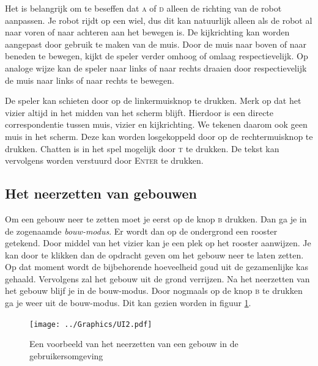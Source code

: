     Het is belangrijk om te beseffen dat \textsc{a} of \textsc{d} alleen de richting van de robot aanpassen. Je robot rijdt op een wiel, dus dit kan natuurlijk alleen als de robot al naar voren of naar achteren aan het bewegen is. De kijkrichting kan worden aangepast door gebruik te maken van de muis. Door de muis naar boven of naar beneden te bewegen, kijkt de speler verder omhoog of omlaag respectievelijk. Op analoge wijze kan de speler naar links of naar rechts draaien door respectievelijk de muis naar links of naar rechts te bewegen.

    De speler kan schieten door op de linkermuisknop te drukken. Merk op dat het vizier altijd in het midden van het scherm blijft. Hierdoor is een directe correspondentie tussen muis, vizier en kijkrichting. We tekenen daarom ook geen muis in het scherm. Deze kan worden losgekoppeld door op de rechtermuisknop te drukken. Chatten is in het spel mogelijk door \textsc{t} te drukken. De tekst kan vervolgens worden verstuurd door \textsc{Enter} te drukken.

    \subsection{Het neerzetten van gebouwen}
    Om een gebouw neer te zetten moet je eerst op de knop \textsc{b} drukken. Dan ga je in de zogenaamde \emph{bouw-modus}. Er wordt dan op de ondergrond een rooster getekend. Door middel van het vizier kan je een plek op het rooster aanwijzen. Je kan door te klikken dan de opdracht geven om het gebouw neer te laten zetten. Op dat moment wordt de bijbehorende hoeveelheid goud uit de gezamenlijke kas gehaald. Vervolgens zal het gebouw uit de grond verrijzen. Na het neerzetten van het gebouw blijf je in de bouw-modus. Door nogmaals op de knop \textsc{b} te drukken ga je weer uit de bouw-modus. Dit kan gezien worden in figuur \ref{fig:gebouw}.

    \begin{figure}
    \centering
    \texttt{[image: ../Graphics/UI2.pdf]}
    \caption{Een voorbeeld van het neerzetten van een gebouw in de gebruikersomgeving}
    \label{fig:gebouw}
    \end{figure} 